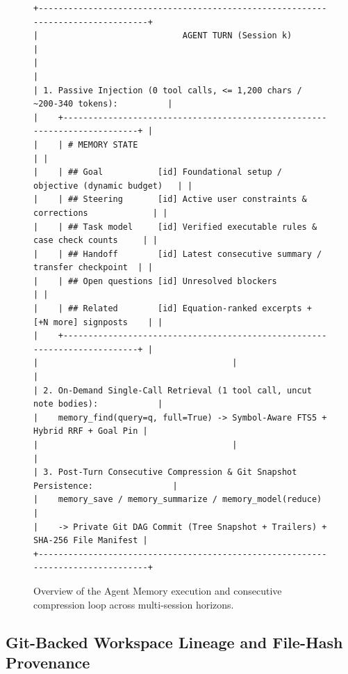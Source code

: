 \documentclass[11pt,a4paper]{article}
\begin{document}
\begin{figure}[t]
\centering
\begin{lstlisting}
+---------------------------------------------------------------------------------+
|                             AGENT TURN (Session k)                              |
|                                                                                 |
| 1. Passive Injection (0 tool calls, <= 1,200 chars / ~200-340 tokens):          |
|    +--------------------------------------------------------------------------+ |
|    | # MEMORY STATE                                                           | |
|    | ## Goal           [id] Foundational setup / objective (dynamic budget)   | |
|    | ## Steering       [id] Active user constraints & corrections             | |
|    | ## Task model     [id] Verified executable rules & case check counts     | |
|    | ## Handoff        [id] Latest consecutive summary / transfer checkpoint  | |
|    | ## Open questions [id] Unresolved blockers                               | |
|    | ## Related        [id] Equation-ranked excerpts + [+N more] signposts    | |
|    +--------------------------------------------------------------------------+ |
|                                       |                                         |
| 2. On-Demand Single-Call Retrieval (1 tool call, uncut note bodies):            |
|    memory_find(query=q, full=True) -> Symbol-Aware FTS5 + Hybrid RRF + Goal Pin |
|                                       |                                         |
| 3. Post-Turn Consecutive Compression & Git Snapshot Persistence:                |
|    memory_save / memory_summarize / memory_model(reduce)                        |
|    -> Private Git DAG Commit (Tree Snapshot + Trailers) + SHA-256 File Manifest |
+---------------------------------------------------------------------------------+
\end{lstlisting}
\caption{Overview of the Agent Memory execution and consecutive compression loop across multi-session horizons.}
\label{fig:architecture}
\end{figure}

\subsection{Git-Backed Workspace Lineage and File-Hash Provenance}
\end{document}
